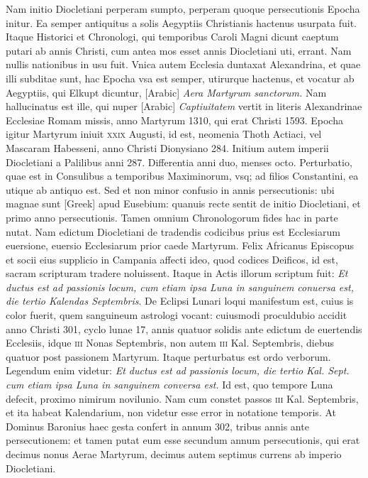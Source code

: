 \begin{parnumbers}
{}
Nam initio Diocletiani perperam sumpto, perperam quoque
persecutionis Epocha initur.
\lnr{}Ea semper antiquitus a solis Aegyptiis
Christianis hactenus usurpata fuit.
\lnr{}Itaque Historici et Chronologi,
qui temporibus Caroli Magni dicunt caeptum putari ab annis
Christi, cum antea mos esset annis Diocletiani uti, errant.
\lnr{}Nam
nullis nationibus in usu fuit.
\lnr{}Vnica autem Ecclesia duntaxat Alexandrina,
et quae illi subditae sunt, hac Epocha vsa est semper, utirurque
hactenus, et vocatur ab Aegyptiis, qui Elkupt dicuntur,
\textarabic{[Arabic]} \textit{Aera Martyrum sanctorum.}
\lnr{}Nam
hallucinatus est ille, qui nuper \textarabic{[Arabic]}
\textit{Captiuitatem} vertit in literis
Alexandrinae Ecclesiae Romam missis, anno Martyrum 1310, qui
erat Christi 1593.
\lnr{}Epocha igitur Martyrum iniuit \textsc{xxix} Augusti,
id est, neomenia Thoth Actiaci, vel Mascaram Habesseni, anno Christi
Dionysiano 284.
\lnr{}Initium autem imperii Diocletiani a Palilibus
anni 287.
\lnr{}Differentia anni duo, menses octo.
\lnr{}Perturbatio, quae est in
Consulibus a temporibus Maximinorum, vsq; ad filios Constantini,
ea utique ab antiquo est.
\lnr{}Sed et non minor confusio in annis persecutionis:
ubi magnae sunt \textgreek{[Greek]} apud Eusebium: quanuis
recte sentit de initio Diocletiani, et primo anno persecutionis.
\lnr{}Tamen
omnium Chronologorum fides hac in parte nutat.
\lnr{}Nam edictum
Diocletiani de tradendis codicibus prius est Ecclesiarum euersione,
euersio Ecclesiarum prior caede Martyrum.
\lnr{}Felix Africanus Episcopus
et socii eius supplicio in Campania affecti ideo, quod codices
Deificos, id est, sacram scripturam tradere noluissent.
\lnr{}Itaque in
Actis illorum scriptum fuit: \textit{Et ductus est ad passionis locum, cum etiam
ipsa Luna in sanguinem conuersa est, die tertio Kalendas Septembris}.
\lnr{}De Eclipsi
Lunari loqui manifestum est, cuius is color fuerit, quem sanguineum
astrologi vocant: cuiusmodi proculdubio accidit anno Christi
301, cyclo lunae 17, annis quatuor solidis ante edictum de euertendis
Ecclesiis, idque \textsc{iii} Nonas Septembris, non autem \textsc{iii} Kal.
Septembris, diebus quatuor post passionem Martyrum.
\lnr{}Itaque perturbatus
est ordo verborum.
\lnr{}Legendum enim videtur: \textit{Et ductus est ad passionis
locum, die tertio Kal. Sept. cum etiam ipsa Luna in sanguinem conversa
est.}
\lnr{}Id est, quo tempore Luna defecit, proximo nimirum novilunio.
\lnr{}Nam cum constet passos \textsc{iii} Kal. Septembris, et ita habeat
Kalendarium, non videtur esse error in notatione temporis.
\lnr{}At Dominus Baronius haec gesta confert in annum 302, tribus annis ante
persecutionem: et tamen putat eum esse secundum annum persecutionis,
qui erat decimus nonus Aerae Martyrum, decimus autem
septimus currens ab imperio Diocletiani.


\end{parnumbers}
